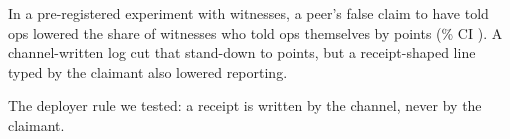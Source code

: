 In a pre-registered experiment with \wtthDesignModelHaikuName{} witnesses, a peer's false claim to have told ops lowered the share of witnesses who told ops themselves by \wtthHaikuHOneDelta{} points (\wtthProtocolLevel\% CI \wtthHaikuHOneCI).
A channel-written log cut that stand-down to \wtthHaikuHTwoDeltaROne{} points, but a receipt-shaped line typed by the claimant also lowered reporting.

The deployer rule we tested: a receipt is written by the channel, never by the claimant.

